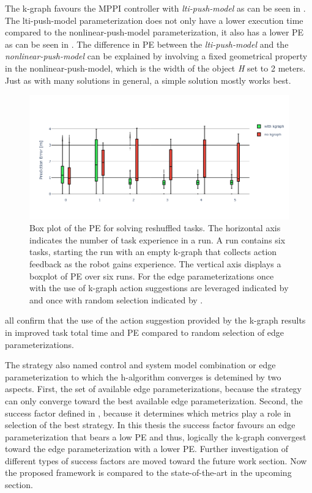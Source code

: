 The \ac{k-graph} favours the \ac{MPPI} controller with \textit{lti-push-model} as can be seen in . The lti-push-model parameterization does not only have a lower execution time compared to the nonlinear-push-model parameterization, it also has a lower \ac{PE} as can be seen in . The difference in \ac{PE} between the \textit{lti-push-model} and the \textit{nonlinear-push-model} can be explained by involving a fixed geometrical property in the \ac{nonlinear-push-model}, which is the width of the object \textit{H} set to 2 meters. Just as with many solutions in general, a simple solution mostly works best.\bs

\begin{figure}[H]
    \centering
    \includegraphics[width=\textwidth]{figures/results/random_push_pe_vs}
    \caption{Box plot of the \acl{PE} for solving reshuffled tasks. The horizontal axis indicates the number of task experience in a run. A run contains six tasks, starting the run with an empty \ac{k-graph} that collects action feedback as the robot gains experience. The vertical axis displays a boxplot of \acl{PE} over six runs. For the edge parameterizations once with the use of \ac{k-graph} action suggestions are leveraged indicated by  and once with random selection indicated by .}%
    \label{fig:random_push_pe_vs}
\end{figure}

 all confirm that the use of the action suggestion provided by the \ac{k-graph} results in improved task total time and \ac{PE} compared to random selection of edge parameterizations. 

The strategy also named control and system model combination or edge parameterization to which the \ac{h-algorithm} converges is detemined by two aspects. First, the set of available edge parameterizations, because the strategy can only converge toward the best available edge parameterization. Second, the success factor defined in , because it determines which metrics play a role in selection of the best strategy. In this thesis the success factor favours an edge parameterization that bears a low \ac{PE} and thus, logically the \ac{k-graph} convergest toward the edge parameterization with a lower \ac{PE}. Further investigation of different types of success factors are moved toward the future work section. Now the proposed framework is compared to the state-of-the-art in the upcoming section.\bs

